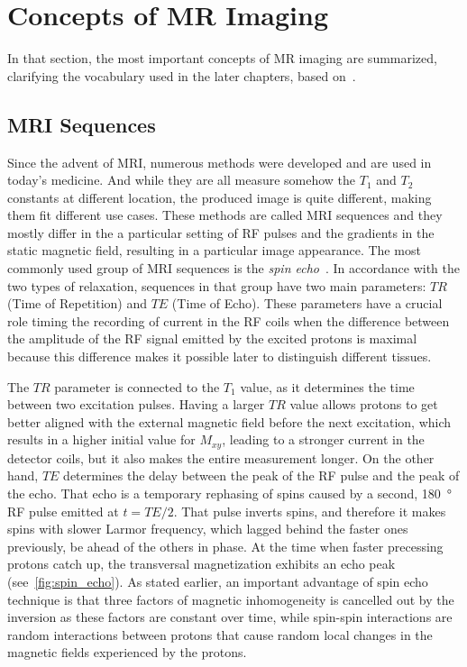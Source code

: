 \section{Concepts of MR Imaging}

In that section, the most important concepts of MR imaging are summarized, clarifying the vocabulary used in the later chapters, based on~\cite{nishimura_principles_1996, pooley_fundamental_2005}.

\subsection{MRI Sequences}
Since the advent of MRI, numerous methods were developed and are used in today's medicine. And while they are all measure somehow the $T_1$ and $T_2$ constants at different location, the produced image is quite different, making them fit different use cases. These methods are called MRI sequences and they mostly differ in the a particular setting of RF pulses and the gradients in the static magnetic field, resulting in a particular image appearance. The most commonly used group of MRI sequences is the \textit{spin echo}~\cite{hahn_spin_1950}. In accordance with the two types of relaxation, sequences in that group have two main parameters: $TR$ (Time of Repetition) and $TE$ (Time of Echo). These parameters have a crucial role timing the recording of current in the RF coils when the difference between the amplitude of the RF signal emitted by the excited protons is maximal because this difference makes it possible later to distinguish different tissues.

The $TR$ parameter is connected to the $T_1$ value, as it determines the time between two excitation pulses. Having a larger $TR$ value allows protons to get better aligned with the external magnetic field before the next excitation, which results in a higher initial value for $M_{xy}$, leading to a stronger current in the detector coils, but it also makes the entire measurement longer. On the other hand, $TE$ determines the delay between the peak of the RF pulse and the peak of the echo. That echo is a temporary rephasing of spins caused by a second, \SI{180}{\degree} RF pulse emitted at $t = TE/2$. That pulse inverts spins, and therefore it makes spins with slower Larmor frequency, which lagged behind the faster ones previously, be ahead of the others in phase. At the time when faster precessing protons catch up, the transversal magnetization exhibits an echo peak (see~\ref{fig:spin_echo}). As stated earlier, an important advantage of spin echo technique is that three factors of magnetic inhomogeneity is cancelled out by the inversion as these factors are constant over time, while spin-spin interactions are random interactions between protons that cause random local changes in the magnetic fields experienced by the protons.

